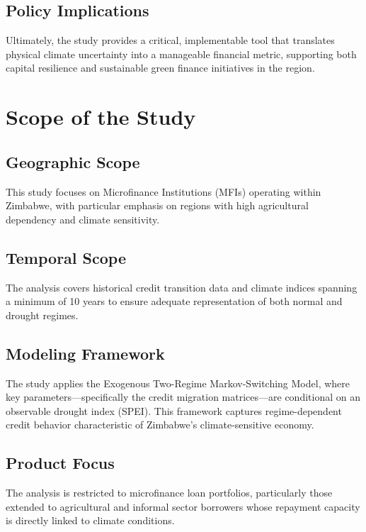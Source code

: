 \documentclass[12pt,a4paper]{article}
\begin{document}
\subsection{Policy Implications}

Ultimately, the study provides a critical, implementable tool that translates physical climate uncertainty into a manageable financial metric, supporting both capital resilience and sustainable green finance initiatives in the region.

\section{Scope of the Study}

\subsection{Geographic Scope}

This study focuses on Microfinance Institutions (MFIs) operating within Zimbabwe, with particular emphasis on regions with high agricultural dependency and climate sensitivity.

\subsection{Temporal Scope}

The analysis covers historical credit transition data and climate indices spanning a minimum of 10 years to ensure adequate representation of both normal and drought regimes.

\subsection{Modeling Framework}

The study applies the Exogenous Two-Regime Markov-Switching Model, where key parameters---specifically the credit migration matrices---are conditional on an observable drought index (SPEI). This framework captures regime-dependent credit behavior characteristic of Zimbabwe's climate-sensitive economy.

\subsection{Product Focus}

The analysis is restricted to microfinance loan portfolios, particularly those extended to agricultural and informal sector borrowers whose repayment capacity is directly linked to climate conditions.
\end{document}
